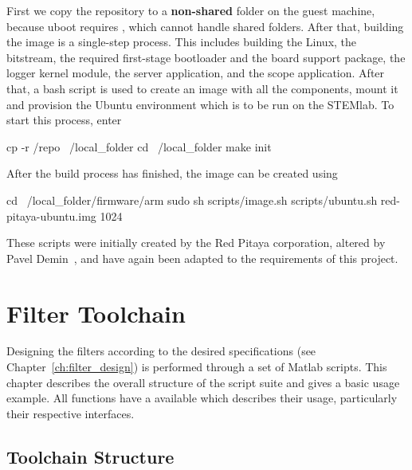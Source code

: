 First  we  copy  the  repository  to  a  \textbf{non-shared}  folder  on  the  guest
machine,  because uboot  requires  , which  cannot handle  shared
folders. After  that,  building the  image  is  a single-step  process.   This
includes building the Linux, the bitstream, the required first-stage bootloader
and  the  board  support  package,   the  logger  kernel  module,  the  server
application, and the scope application.  After  that, a bash script is used to
create an  image with all  the components, mount  it and provision  the Ubuntu
environment which is to be run on the STEMlab. To start this process, enter
\begin{commandshell}
        cp -r /repo ~/local_folder
        cd ~/local_folder
        make init
\end{commandshell}

After the build process has finished, the image can be created using
\begin{commandshell}
        cd ~/local_folder/firmware/arm
        sudo sh scripts/image.sh scripts/ubuntu.sh red-pitaya-ubuntu.img 1024
\end{commandshell}
\noindent These scripts were initially  created by the Red Pitaya corporation,
altered by  Pavel Demin~\cite{pita:github:pitaya-notes},  and have  again been
adapted to the requirements of this project.

%
%
\chapter{Filter Toolchain} %
\label{ch:devguide:filter_toolchain}

Designing   the  filters   according  to   the  desired   specifications  (see
Chapter~\ref{ch:filter_design})  is   performed  through   a  set   of  Matlab
scripts. This chapter describes the overall  structure of the script suite and
gives a basic usage example. All  functions have a  available which
describes their usage, particularly their respective interfaces.

\section{Toolchain Structure} %
\label{sec:devguide:filter_toolchain:structure}

